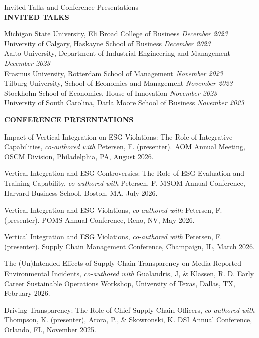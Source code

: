 \documentclass{resume} %
\begin{document}
\begin{rSection}{Invited Talks and Conference Presentations}
\ \\
\MakeUppercase{\bf{Invited Talks}}

Michigan State University, Eli Broad College of Business \hfill {\em December 2023}\\
University of Calgary, Haskayne School of Business \hfill {\em December 2023}\\
Aalto University, Department of Industrial Engineering and Management \hfill {\em December 2023}\\
Erasmus University, Rotterdam School of Management \hfill {\em November 2023}\\
Tilburg University, School of Economics and Management \hfill {\em November 2023}\\
Stockholm School of Economics, House of Innovation \hfill {\em November 2023}\\
University of South Carolina, Darla Moore School of Business \hfill {\em November 2023}

\MakeUppercase{\bf{Conference Presentations}}

Impact of Vertical Integration on ESG Violations: The Role of Integrative Capabilities, \textit{co-authored with} Petersen, F. (presenter). AOM Annual Meeting, OSCM Division, Philadelphia, PA, August 2026.

Vertical Integration and ESG Controversies: The Role of ESG Evaluation-and-Training Capability, \textit{co-authored with} Petersen, F. MSOM Annual Conference, Harvard Business School, Boston, MA, July 2026.

Vertical Integration and ESG Violations, \textit{co-authored with} Petersen, F. (presenter). POMS Annual Conference, Reno, NV, May 2026.

Vertical Integration and ESG Violations, \textit{co-authored with} Petersen, F. (presenter). Supply Chain Management Conference, Champaign, IL, March 2026.

The (Un)Intended Effects of Supply Chain Transparency on Media-Reported Environmental Incidents, \textit{co-authored with} Gualandris, J, \& Klassen, R. D. Early Career Sustainable Operations Workshop, University of Texas, Dallas, TX, February 2026.

Driving Transparency: The Role of Chief Supply Chain Officers, \textit{co-authored with} Thompson, K. (presenter), Arora, P., \& Skowronski, K. DSI Annual Conference, Orlando, FL, November 2025.


\end{rSection}
\end{document}
